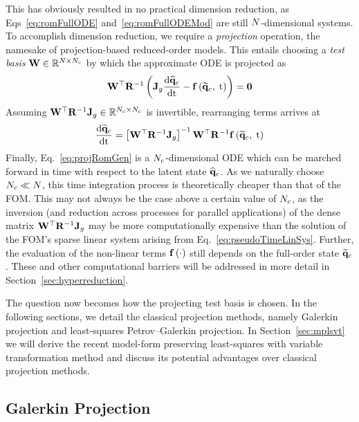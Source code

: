 This has obviously resulted in no practical dimension reduction, as Eqs~\ref{eq:romFullODE} and~\ref{eq:romFullODEMod} are still $N$-dimensional systems. To accomplish dimension reduction, we require a \textit{projection} operation, the namesake of projection-based reduced-order models. This entails choosing a \textit{test basis} $\testBasis \inRTwo{\numDOF}{\numConsModes}$ by which the approximate ODE is projected as
%
\begin{equation}\label{eq:contRomRes}
    \testBasis^\top \resScaleInv \left(\jacobDecode \ode{\consVecCoef}{\timeVar} - \rhsFunc{\consVecRom, \; \timeVar} \right) = \zeroVec
\end{equation}
%
Assuming $\testBasis^\top \resScaleInv \jacobDecode \inRTwo{\numConsModes}{\numConsModes}$ is invertible, rearranging terms arrives at
%
\begin{equation}\label{eq:projRomGen}
    \ode{\consVecCoef}{\timeVar} = \left[\testBasis^\top \resScaleInv \jacobDecode\right]^{-1} \testBasis^\top \resScaleInv \rhsFunc{\consVecRom, \; \timeVar}
\end{equation}
%
Finally, Eq.~\ref{eq:projRomGen} is a $N_c$-dimensional ODE which can be marched forward in time with respect to the latent state $\mathbf{\widehat{q}}_{c}$. As we naturally choose $N_c \ll N$, this time integration process is theoretically cheaper than that of the FOM. This may not always be the case above a certain value of $N_c$, as the inversion (and reduction across processes for parallel applications) of the dense matrix $\testBasis^\top \resScaleInv \jacobDecode$ may be more computationally expensive than the solution of the FOM's sparse linear system arising from Eq.~\ref{eq:pseudoTimeLinSys}. Further, the evaluation of the non-linear terms $\mathbf{f} \left(\cdot\right)$ still depends on the full-order state $\mathbf{\widetilde{q}}_{c}$. These and other computational barriers will be addressed in more detail in Section~\ref{sec:hyperreduction}.

The question now becomes how the projecting test basis is chosen. In the following sections, we detail the classical projection methods, namely Galerkin projection and least-squares Petrov--Galerkin projection. In Section~\ref{sec:mplsvt} we will derive the recent model-form preserving least-squares with variable transformation method and discuss its potential advantages over classical projection methods.

\subsection{Galerkin Projection}

